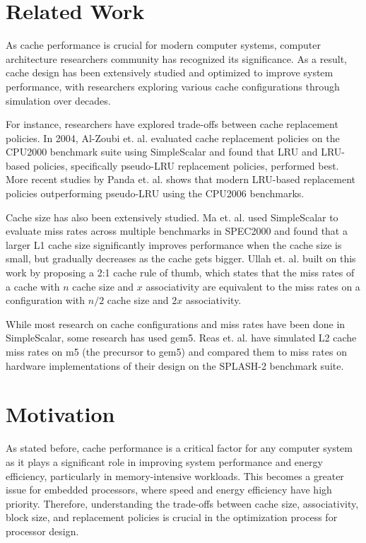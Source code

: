\documentclass[conference]{IEEEtran}
\begin{document}
\section{Related Work}

As cache performance is crucial for modern computer systems, computer architecture researchers community has recognized its significance. As a result, cache design has been extensively studied and optimized to improve system performance, with researchers exploring various cache configurations through simulation over decades.

For instance, researchers have explored trade-offs between cache replacement policies. In 2004, Al-Zoubi et. al.\cite{10.1145/986537.986601} evaluated cache replacement policies on the CPU2000 benchmark suite using SimpleScalar and found that LRU and LRU-based policies, specifically pseudo-LRU replacement policies, performed best. More recent studies by Panda et. al.\cite{7806218} shows that modern LRU-based replacement policies outperforming pseudo-LRU using the CPU2006 benchmarks.

Cache size has also been extensively studied. Ma et. al.\cite{5260945} used SimpleScalar to evaluate miss rates across multiple benchmarks in SPEC2000 and found that a larger L1 cache size significantly improves performance when the cache size is small, but gradually decreases as the cache gets bigger. Ullah et. al.\cite{8975563} built on this work by proposing a 2:1 cache rule of thumb, which states that the miss rates of a cache with $n$ cache size and $x$ associativity are equivalent to the miss rates on a configuration with $n/2$ cache size and $2x$ associativity.

While most research on cache configurations and miss rates have been done in SimpleScalar, some research has used gem5. Reas et. al.\cite{10.1109/UKSIM.2010.35} have simulated L2 cache miss rates on m5 (the precursor to gem5) and compared them to miss rates on hardware implementations of their design on the SPLASH-2 benchmark suite.

\section{Motivation}

As stated before, cache performance is a critical factor for any computer system as it plays a significant role in improving system performance and energy efficiency, particularly in memory-intensive workloads. This becomes a greater issue for embedded processors, where speed and energy efficiency have high priority. Therefore, understanding the trade-offs between cache size, associativity, block size, and replacement policies is crucial in the optimization process for processor design.
\end{document}
